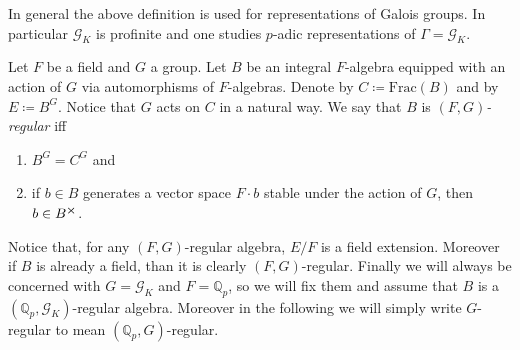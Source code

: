 \begin{rem}[]
	In general the above definition is used for representations of Galois groups.
	In particular $\mathscr{G}_K$ is profinite and one studies
	$p$-adic representations of $\Gamma = \mathscr{G}_K$.
\end{rem}




\begin{defn}
	Let $F$ be a field and $G$ a group.
	Let $B$ be an integral $F$-algebra
	equipped with an action of $G$ via automorphisms of $F$-algebras.
	Denote by $C \coloneqq \mathrm{Frac}(B)$ and by $E \coloneqq B^{G}$.
	Notice that $G$ acts on $C$ in a natural way.
	We say that $B$ is {\em $(F,G)$-regular} iff
\begin{enumerate}
	\item $B^{G} = C^{G}$ and
	\item if $b \in B$ generates a vector space $F \cdot b$
		stable under the action of $G$, then $b \in B^{\cross}$.
\end{enumerate}
\end{defn}


\begin{rem}[]
	Notice that, for any $(F,G)$-regular algebra, $E/F$ is a field extension.
	Moreover if $B$ is already a field, than it is clearly $(F,G)$-regular.
	Finally we will always be concerned with $G = \mathscr{G}_K$ and $F = \mathbb{Q}_p$,
	so we will fix them and assume that $B$ is a $(\mathbb{Q}_p, \mathscr{G}_K)$-regular
	algebra.
	Moreover in the following we will simply write 
	$G$-regular to mean $(\mathbb{Q}_p, G)$-regular.
\end{rem}


